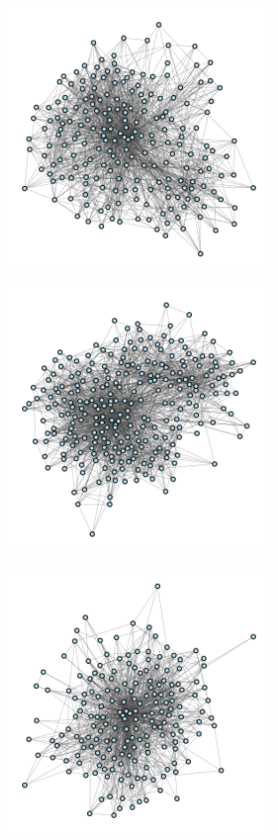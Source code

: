 \documentclass[12pt]{article}
\begin{document}
\begin{appendix}
\begin{figure}
  \includegraphics[width=0.7\textwidth]{../3_results/town_12.png} \\
\end{figure}
\begin{figure}
  \centering
  \caption{\protect}
  \includegraphics[width=0.7\textwidth]{../3_results/town_13.png} \\
\end{figure}
\begin{figure}
  \centering
  \caption{\protect}
  \includegraphics[width=0.7\textwidth]{../3_results/town_14.png} \\

\end{figure}
\end{appendix}
\end{document}
